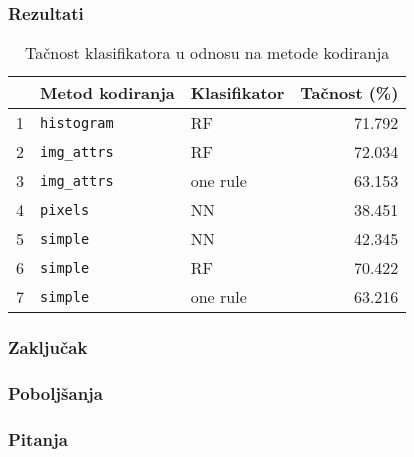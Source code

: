 \documentclass{beamer}
\begin{document}
\begin{frame}
	\frametitle{Rezultati}
	\begin{table}
		\begin{tabular}{rllr}
		 & Metod kodiranja & Klasifikator & Tačnost (\%)\\
		\hline
		1 & \texttt{histogram} & RF & 71.792\\
		2 & \texttt{img\_attrs} & RF & 72.034\\
		3 & \texttt{img\_attrs} & one rule & 63.153\\
		4 & \texttt{pixels} & NN & 38.451\\
		5 & \texttt{simple} & NN & 42.345\\
		6 & \texttt{simple} & RF & 70.422\\
		7 & \texttt{simple} & one rule & 63.216\\
		\end{tabular}
		\caption{Tačnost klasifikatora u odnosu na metode kodiranja}
	\end{table}

\end{frame}

\begin{frame}
	\frametitle{Zaključak}


\end{frame}

\begin{frame}
	\frametitle{Poboljšanja}

\end{frame}

\begin{frame}
	\frametitle{Pitanja}

\end{frame}
\end{document}
